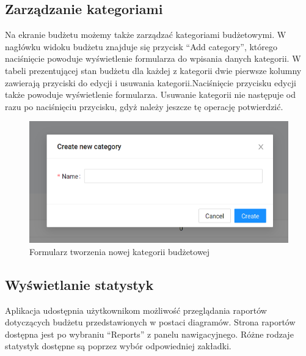 \documentclass[shortabstract,inz]{iithesis}
\begin{document}
\subsection{Zarządzanie kategoriami}
Na ekranie budżetu możemy także zarządzać kategoriami budżetowymi. W nagłówku widoku budżetu znajduje się przycisk ``Add category'', którego naciśnięcie powoduje wyświetlenie formularza do wpisania danych kategorii. W tabeli prezentującej stan budżetu dla każdej z kategorii dwie pierwsze kolumny zawierają przyciski do edycji i usuwania kategorii.Naciśnięcie przycisku edycji także powoduje wyświetlenie formularza. Usuwanie kategorii nie następuje od razu po naciśnięciu przycisku, gdyż należy jeszcze tę operację potwierdzić.
\begin{figure}
\centering
	\includegraphics[scale=0.7]{screen-category-add-form.png}
	\caption{Formularz tworzenia nowej kategorii budżetowej}
	\label{fig:screen-heatmap}
\end{figure}
\subsection{Wyświetlanie statystyk}
Aplikacja udostępnia użytkownikom możliwość przeglądania raportów dotyczących budżetu przedstawionych w postaci diagramów. Strona raportów dostępna jest po wybraniu ``Reports'' z panelu nawigacyjnego. Różne rodzaje statystyk dostępne są poprzez wybór odpowiedniej zakładki.
\end{document}
